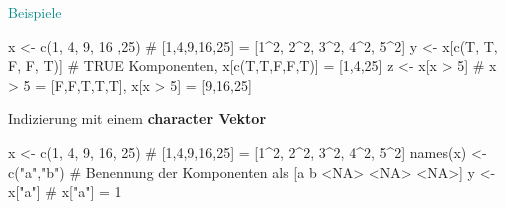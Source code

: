 \documentclass[
  8pt,
  ignorenonframetext,
]{beamer}
\newenvironment{Shaded}{\begin{snugshade}}{\end{snugshade}}
\newcommand{\CommentTok}[1]{\textcolor[rgb]{0.37,0.37,0.37}{#1}}
\newcommand{\DecValTok}[1]{\textcolor[rgb]{0.68,0.00,0.00}{#1}}
\newcommand{\FunctionTok}[1]{\textcolor[rgb]{0.28,0.35,0.67}{#1}}
\newcommand{\NormalTok}[1]{\textcolor[rgb]{0.00,0.23,0.31}{#1}}
\newcommand{\OtherTok}[1]{\textcolor[rgb]{0.00,0.23,0.31}{#1}}
\newcommand{\SpecialCharTok}[1]{\textcolor[rgb]{0.37,0.37,0.37}{#1}}
\newcommand{\StringTok}[1]{\textcolor[rgb]{0.13,0.47,0.30}{#1}}
\begin{document}
\begin{frame}[fragile]{\textcolor{darkcyan}{Beispiele}}
\begin{Shaded}
\begin{Highlighting}[]
\NormalTok{x }\OtherTok{\textless{}{-}} \FunctionTok{c}\NormalTok{(}\DecValTok{1}\NormalTok{, }\DecValTok{4}\NormalTok{, }\DecValTok{9}\NormalTok{, }\DecValTok{16}\NormalTok{ ,}\DecValTok{25}\NormalTok{)   }\CommentTok{\# [1,4,9,16,25] = [1\^{}2, 2\^{}2, 3\^{}2, 4\^{}2, 5\^{}2]}
\NormalTok{y }\OtherTok{\textless{}{-}}\NormalTok{ x[}\FunctionTok{c}\NormalTok{(T, T, F, F, T)]  }\CommentTok{\# TRUE Komponenten,  x[c(T,T,F,F,T)] = [1,4,25]}
\NormalTok{z }\OtherTok{\textless{}{-}}\NormalTok{ x[x }\SpecialCharTok{\textgreater{}} \DecValTok{5}\NormalTok{]             }\CommentTok{\# x \textgreater{} 5 = [F,F,T,T,T], x[x \textgreater{} 5] = [9,16,25]}
\end{Highlighting}
\end{Shaded}

Indizierung mit einem \textbf{character Vektor}

\begin{Shaded}
\begin{Highlighting}[]
\NormalTok{x }\OtherTok{\textless{}{-}} \FunctionTok{c}\NormalTok{(}\DecValTok{1}\NormalTok{, }\DecValTok{4}\NormalTok{, }\DecValTok{9}\NormalTok{, }\DecValTok{16}\NormalTok{, }\DecValTok{25}\NormalTok{)   }\CommentTok{\# [1,4,9,16,25] = [1\^{}2, 2\^{}2, 3\^{}2, 4\^{}2, 5\^{}2]}
\FunctionTok{names}\NormalTok{(x) }\OtherTok{\textless{}{-}} \FunctionTok{c}\NormalTok{(}\StringTok{"a"}\NormalTok{,}\StringTok{"b"}\NormalTok{)    }\CommentTok{\# Benennung der Komponenten als [a  b \textless{}NA\textgreater{} \textless{}NA\textgreater{} \textless{}NA\textgreater{}]}
\NormalTok{y }\OtherTok{\textless{}{-}}\NormalTok{ x[}\StringTok{"a"}\NormalTok{]               }\CommentTok{\# x["a"] = 1}
\end{Highlighting}
\end{Shaded}
\end{frame}
\end{document}
